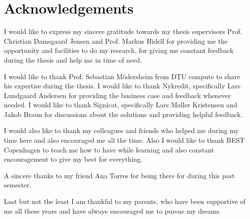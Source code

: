 \chapter{Acknowledgements}

I would like to express my sincere gratitude towards my thesis supervisors Prof. Christian Damsgaard Jensen and Prof. Markus Hidell for providing me the opportunity and facilities to do my research, for giving me constant feedback during the thesis and help me in time of need.

I would like to thank Prof. Sebastian Mödersheim from DTU compute to share his expertise during the thesis. I would like to thank Nykredit, specifically Lars Lundgaard Andersen for providing the business case and feedback whenever needed. I would like to thank Signicat, specifically Lars Møller Kristensen and Jakob Braun for discussions about the solutions and providing helpful feedback.

I would also like to thank my colleagues and friends who helped me during my time here and also encouraged me all the time. Also I would like to thank BEST Copenhagen to teach me how to have while learning and also constant encouragement to give my best for everything.

A sincere thanks to my friend Ana Torres for being there for during this past semester.

Last but not the least I am thankful to my parents, who have been supportive of me all these years and have always encouraged me to pursue my dreams.